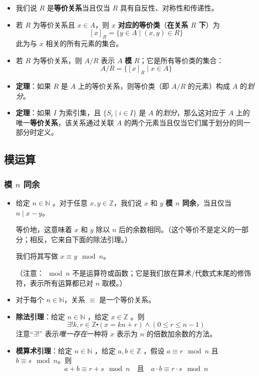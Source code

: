 \begin{itemize}
    \item 我们说 $R$ 是\textbf{等价关系}当且仅当 $R$ 具有自反性、对称性和传递性。
    \item 若 $R$ 为等价关系且 $x \in A$，则 $x$ \textbf{对应的等价类}（\textbf{在关系 $R$ 下}）为
          \[[x]_R = \{y \in A \mid (x, y) \in R\}\]
          此为与 $x$ 相关的所有元素的集合。
    \item 若 $R$ 为等价关系，则 $A/R$ 表示 $A$ \textbf{模} $R$；它是所有等价类的集合：
          \[A/R = \{[x]_R \mid x \in A\}\]
    \item \textbf{定理}：如果 $R$ 是 $A$ 上的等价关系，则等价类（即 $A/R$ 的元素）构成 $A$ 的\emph{划分}。
    \item \textbf{定理}：如果 $I$ 为索引集，且 $\{S_i \mid i \in I\}$ 是 $A$ 的\emph{划分}，那么这对应于 $A$ 上的唯一\textbf{等价关系}，该关系通过关联 $A$ 的两个元素当且仅当它们属于划分的同一部分时定义。
\end{itemize}

\subsection{模运算}

\subsubsection{模 $n$ 同余}

\begin{itemize}
    \item 给定 $n \in \mathbb{N}$ 。对于任意 $x, y \in \mathbb{Z}$，我们说 $x$ 和 $y$ \textbf{模 $n$ 同余}，当且仅当 $n \mid x-y$。

          等价地，这意味着 $x$ 和 $y$ 除以 $n$ 后的余数相同。（这个等价不是定义的一部分；相反，它来自下面的除法引理。）

          我们将其写做 $x \equiv y \mod n$。

          （注意：$\mod n$ 不是运算符或函数；它是我们放在算术/代数式末尾的修饰符，表示所有运算都已对 $n$ 取模。）
    \item 对于每个 $n \in \mathbb{N}$，关系 $\equiv$ 是一个等价关系。
    \item \textbf{除法引理}：给定 $n \in \mathbb{N}$ ，给定 $x \in \mathbb{Z}$ 。则
          \[\exists! k, r \in \mathbb{Z} \centerdot (x = kn + r) \land (0 \le r \le n - 1)\]
          注意``$\exists !$'' 表示\emph{唯一存在}一种将 $x$ 表示为 $n$ 的倍数加余数的方法。
    \item \textbf{模算术引理}：给定 $n \in \mathbb{N}$ ，给定 $a, b \in \mathbb{Z}$ ，假设 $a \equiv r \mod n$ 且 $b \equiv s \mod n$。则
          \[a + b \equiv r + s \mod n \quad \text{且} \quad a \cdot b \equiv r \cdot s \mod n\]
\end{itemize}

